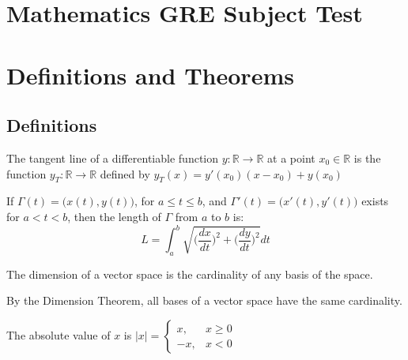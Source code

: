 \documentclass[crop=false,class=article,oneside]{standalone}
\begin{document}
    \ifx\ifcoursesmathgre\undefined
        \section*{Mathematics GRE Subject Test}
        \setcounter{section}{1}
        \renewcommand\thefigure{\arabic{section}.\arabic{figure}}
        \renewcommand\thesubfigure{%
            \arabic{section}.\arabic{figure}.\arabic{subfigure}}
    \else
        \section{Definitions and Theorems}
    \fi
    \subsection{Definitions}
        \begin{definition*}
                The tangent line of a differentiable function
                $y:\mathbb{R}\rightarrow\mathbb{R}$ at a point
                $x_{0}\in\mathbb{R}$ is the function
                $y_{T}:\mathbb{R}\rightarrow\mathbb{R}$ defined by
                $y_{T}(x)=y'(x_0)(x-x_0)+y(x_0)$ 
            \end{definition*}
        \begin{definition*}
            If $\Gamma(t)=\big(x(t),y(t)\big)$, for $a\leq t\leq b$,
            and $\Gamma'(t)=\big(x'(t),y'(t)\big)$ exists for
            $a<t<b$, then the length of $\Gamma$ from $a$ to $b$ is:
            \begin{equation}
                L=\int_{a}^{b}\sqrt{
                    \bigg(\frac{dx}{dt}\bigg)^{2}+
                    \bigg(\frac{dy}{dt}\bigg)^{2}
                }dt
            \end{equation}
        \end{definition*}
        \begin{definition*}
            The dimension of a vector space is the cardinality of
            any basis of the space. 
        \end{definition*}
        \begin{remark*}
            By the Dimension Theorem, all bases of a vector space
            have the same cardinality.
        \end{remark*}
        \begin{definition*}
            The absolute value of $x$ is
            $|x|=\begin{cases}%
                x,&x\geq 0\\ 
                -x,&x<0
            \end{cases}$
        \end{definition*}
\end{document}
